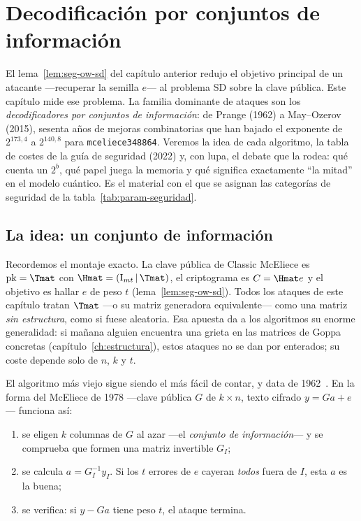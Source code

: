 \chapter{Decodificación por conjuntos de información}\label{ch:isd}

\begin{roadmap}
El lema~\ref{lem:seg-ow-sd} del capítulo anterior redujo el objetivo
principal de un atacante ---recuperar la semilla $e$--- al problema
SD sobre la clave pública. Este capítulo mide ese problema. La
familia dominante de ataques son los \emph{decodificadores por
conjuntos de información}: de Prange (1962) a May--Ozerov (2015),
sesenta años de mejoras combinatorias que han bajado el exponente de
$2^{173{,}4}$ a $2^{140{,}8}$ para \texttt{mceliece348864}. Veremos la
idea de cada algoritmo, la tabla de costes de la guía de seguridad
(2022) y, con lupa, el debate que la rodea: qué cuenta un $2^b$, qué
papel juega la memoria y qué significa exactamente ``la mitad'' en el
modelo cuántico. Es el material con el que se asignan las categorías
de seguridad de la tabla~\ref{tab:param-seguridad}.
\end{roadmap}

\section{La idea: un conjunto de información}

Recordemos el montaje exacto. La clave pública de Classic McEliece es
$\mathrm{pk}=\Tmat$ con $\Hmat=(\mathrm{I}_{mt}\,|\,\Tmat)$, el
criptograma es $C=\Hmat e$ y el objetivo es hallar $e$ de peso $t$
(lema~\ref{lem:seg-ow-sd}). Todos los ataques de este capítulo tratan
$\Tmat$ ---o su matriz generadora equivalente--- como una matriz
\emph{sin estructura}, como si fuese aleatoria. Esa apuesta da a los
algoritmos su enorme generalidad: si mañana alguien encuentra una
grieta en las matrices de Goppa concretas (capítulo~\ref{ch:estructura}),
estos ataques no se dan por enterados; su coste depende solo de
$n$, $k$ y $t$.

El algoritmo más viejo sigue siendo el más fácil de contar, y data de
1962~\cite{prange1962}. En la forma del McEliece de 1978 ---clave
pública $G$ de $k\times n$, texto cifrado $y=Ga+e$--- funciona así:

\begin{enumerate}[leftmargin=1.8em,itemsep=2pt]
  \item se eligen $k$ columnas de $G$ al azar ---el
        \emph{conjunto de información}--- y se comprueba que formen
        una matriz invertible $G_I$;
  \item se calcula $a=G_I^{-1}y_I$. Si los $t$ errores de $e$
        cayeran \emph{todos} fuera de $I$, esta $a$ es la buena;
  \item se verifica: si $y-Ga$ tiene peso $t$, el ataque termina.
\end{enumerate}

